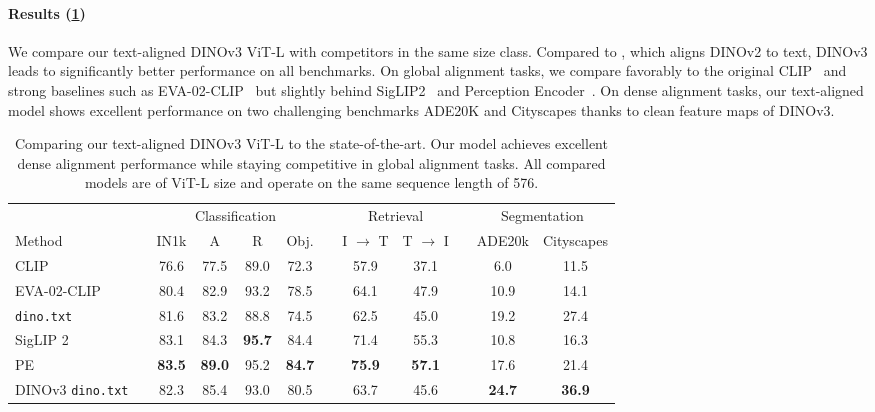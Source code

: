 \paragraph[Results]{Results (\cref{tab:dino_txt})} 
We compare our text-aligned DINOv3 ViT-L with competitors in the same size class. 
Compared to \citet{jose2025dinov2}, which aligns DINOv2 to text, DINOv3 leads to significantly better performance on all benchmarks. 
On global alignment tasks, we compare favorably to the original CLIP~\citep{radford2021learning} and strong baselines such as EVA-02-CLIP~\citep{sun2023eva} but slightly behind SigLIP2~\citep{tschannen2025siglip} and Perception Encoder~\citep{bolya2025perception}. 
On dense alignment tasks, our text-aligned model shows excellent performance on two challenging benchmarks ADE20K and Cityscapes thanks to clean feature maps of DINOv3. 





\begin{table}[t]
    \small
    \centering
    \caption{Comparing our text-aligned DINOv3 ViT-L to the state-of-the-art. 
    Our model achieves excellent dense alignment performance while staying competitive in global alignment tasks. 
    All compared models are of ViT-L size and operate on the same sequence length of 576.}
    \label{tab:dino_txt}
    \setlength{\tabcolsep}{4pt}
    \begin{tabular}{@{}l c cccc c cc c cc@{}}
    \toprule
     && \multicolumn{4}{c}{Classification} && \multicolumn{2}{c}{Retrieval} && \multicolumn{2}{c}{Segmentation} \\
    \cmidrule(lr){3-6} \cmidrule(lr){8-9} \cmidrule(lr){11-12}
    Method &&      IN1k & A & R & Obj. & & I $\rightarrow$ T & T $\rightarrow$ I & & ADE20k & Cityscapes \\
    \midrule
    CLIP && 76.6 & 77.5 & 89.0 & 72.3 && 57.9 & 37.1 && 6.0 & 11.5 \\
    EVA-02-CLIP && 80.4 & 82.9 & 93.2 & 78.5 && 64.1 & 47.9 && 10.9 & 14.1 \\
    \texttt{dino.txt}  && 81.6 & 83.2 & 88.8 & 74.5 && 62.5 & 45.0 && 19.2 & 27.4 \\
    SigLIP 2 && 83.1 & 84.3 & \textbf{95.7} & 84.4 && 71.4 & 55.3 && 10.8 & 16.3 \\
    PE && \textbf{83.5} & \textbf{89.0} & 95.2 & \textbf{84.7} && \textbf{75.9} & \textbf{57.1} && 17.6 & 21.4 \\
    \midrule
    DINOv3 \texttt{dino.txt} && 82.3 & 85.4 & 93.0 & 80.5 && 63.7 & 45.6 && \textbf{24.7} & \textbf{36.9} \\
    \bottomrule
    \end{tabular}
\end{table}
